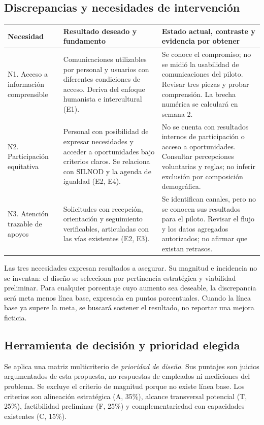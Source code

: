 \documentclass[12pt,letterpaper,oneside]{article}
\begin{document}
\subsection{Discrepancias y necesidades de intervención}
\begin{longtable}{@{}L{.13\textwidth}L{.38\textwidth}L{.42\textwidth}@{}}
\toprule \textbf{Necesidad} & \textbf{Resultado deseado y fundamento} & \textbf{Estado actual, contraste y evidencia por obtener} \\
\midrule\endhead
N1. Acceso a información comprensible & Comunicaciones utilizables por personal y usuarios con diferentes condiciones de acceso. Deriva del enfoque humanista e intercultural (E1). & Se conoce el compromiso; no se midió la usabilidad de comunicaciones del piloto. Revisar tres piezas y probar comprensión. La brecha numérica se calculará en semana 2. \\
N2. Participación equitativa & Personal con posibilidad de expresar necesidades y acceder a oportunidades bajo criterios claros. Se relaciona con SILNOD y la agenda de igualdad (E2, E4). & No se cuenta con resultados internos de participación o acceso a oportunidades. Consultar percepciones voluntarias y reglas; no inferir exclusión por composición demográfica. \\
N3. Atención trazable de apoyos & Solicitudes con recepción, orientación y seguimiento verificables, articuladas con las vías existentes (E2, E3). & Se identifican canales, pero no se conocen sus resultados para el piloto. Revisar el flujo y los datos agregados autorizados; no afirmar que existan retrasos. \\
\bottomrule
\end{longtable}
Las tres necesidades expresan resultados a asegurar. Su magnitud e incidencia no se inventan: el diseño se selecciona por pertinencia estratégica y viabilidad preliminar. Para cualquier porcentaje cuyo aumento sea deseable, la discrepancia será meta menos línea base, expresada en puntos porcentuales. Cuando la línea base ya supere la meta, se buscará sostener el resultado, no reportar una mejora ficticia.

\subsection{Herramienta de decisión y prioridad elegida}
Se aplica una matriz multicriterio de \emph{prioridad de diseño}. Sus puntajes son juicios argumentados de esta propuesta, no respuestas de empleados ni mediciones del problema. Se excluye el criterio de magnitud porque no existe línea base. Los criterios son alineación estratégica (A, 35\%), alcance transversal potencial (T, 25\%), factibilidad preliminar (F, 25\%) y complementariedad con capacidades existentes (C, 15\%).
\end{document}
